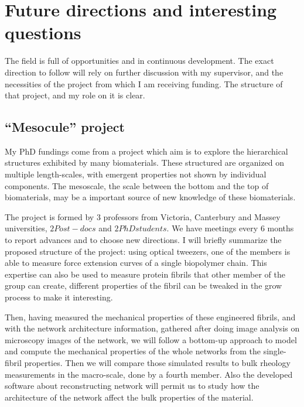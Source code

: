 \section{Future directions and interesting questions}

The field is full of opportunities and in continuous development. The exact
direction to follow will rely on further discussion with my supervisor, and the necessities
of the project from which I am receiving funding. The structure of that project,
and my role on it is clear.

\subsection{``Mesocule'' project}
My PhD fundings come from a project which aim is to explore the hierarchical
structures exhibited by many biomaterials. These structured are organized on
multiple length-scales, with emergent properties not shown by individual
components. The mesoscale, the scale between the bottom and the top of
biomaterials, may be a important source of new knowledge of these biomaterials.

The project is formed by
$3$ professors from Victoria, Canterbury and Massey universities, $2 Post-docs$ and $2 PhD students$. We
have meetings every $6$ months to report advances and to choose new directions.
I will briefly summarize the proposed structure of the project: using optical
tweezers, one of the members is able to  measure force
extension curves of a single biopolymer chain. This expertise can also be  used
to measure protein fibrils that other member of the group can create,  different
properties of the fibril can be tweaked in the grow process to make it
interesting.

Then, having measured the mechanical properties of these engineered
fibrils, and with the network architecture information, gathered after doing
image analysis on microscopy images of the network, we will follow a
bottom-up approach \citep{brown_multiscale_2009,schuster_investigating_2012} to
model and compute the mechanical properties of the whole networks from the single-fibril properties.
Then we will compare those simulated results to
bulk rheology measurements in the macro-scale, done by a fourth member.
Also the developed software about reconstructing network will permit us to 
study how the architecture of the network affect the bulk properties of the material.
 





